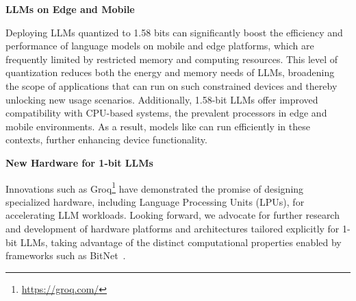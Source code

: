\textbf{LLMs on Edge and Mobile}

Deploying LLMs quantized to 1.58 bits can significantly boost the efficiency and performance of language models on mobile and edge platforms, which are frequently limited by restricted memory and computing resources. This level of quantization reduces both the energy and memory needs of LLMs, broadening the scope of applications that can run on such constrained devices and thereby unlocking new usage scenarios. Additionally, 1.58-bit LLMs offer improved compatibility with CPU-based systems, the prevalent processors in edge and mobile environments. As a result, models like  can run efficiently in these contexts, further enhancing device functionality.

\textbf{New Hardware for 1-bit LLMs}

Innovations such as Groq\footnote{\url{https://groq.com/}} have demonstrated the promise of designing specialized hardware, including Language Processing Units (LPUs), for accelerating LLM workloads. Looking forward, we advocate for further research and development of hardware platforms and architectures tailored explicitly for 1-bit LLMs, taking advantage of the distinct computational properties enabled by frameworks such as BitNet~\cite{bitnet}.
